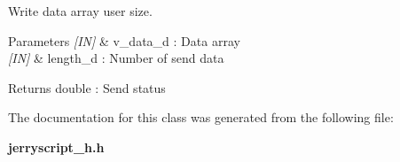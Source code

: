 Write data array user size. 


\begin{DoxyCode}{0}
\DoxyCodeLine{\textcolor{comment}{// Send only 2 char from array}}
\end{DoxyCode}



\begin{DoxyParams}{Parameters}
{\em \mbox{[}\+I\+N\mbox{]}} & v\+\_\+data\+\_\+d \+: Data array \\
\hline
{\em \mbox{[}\+I\+N\mbox{]}} & length\+\_\+d \+: Number of send data \\
\hline
\end{DoxyParams}
\begin{DoxyReturn}{Returns}
double \+: Send status 
\end{DoxyReturn}


The documentation for this class was generated from the following file\+:\begin{DoxyCompactItemize}
\item 
\textbf{ jerryscript\+\_\+h.\+h}\end{DoxyCompactItemize}
